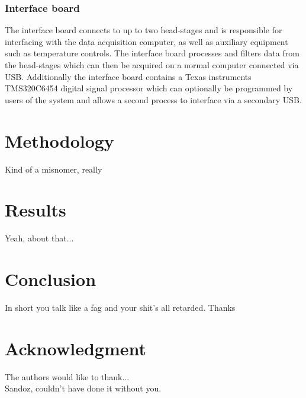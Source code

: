\documentclass[journal]{IEEEtran}
\begin{document}
\subsubsection{Interface board}
The interface board connects to up to two head-stages and is responsible for interfacing
with the data acquisition computer, as well as auxiliary equipment such as temperature
controls.
The interface board processes and filters data from the head-stages which can then be
acquired on a normal computer connected via USB. Additionally the interface board 
contains a Texas instruments TMS320C6454 digital signal processor which can optionally
be programmed by users of the system and allows a second process to interface via a 
secondary USB.

\section{Methodology}
Kind of a misnomer, really

\section{Results}
Yeah, about that...

\section{Conclusion}
In short you talk like a fag and your shit's all retarded. Thanks

\section*{Acknowledgment}
The authors would like to thank...\\
Sandoz, couldn't have done it without you.


 

\end{document}
